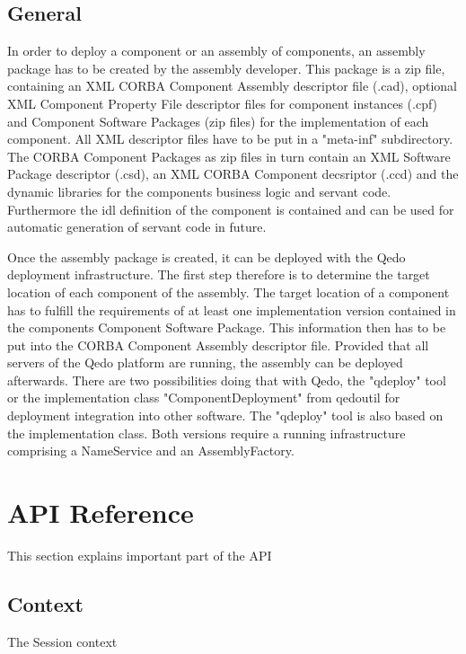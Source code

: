 \documentclass[12pt,a4paper]{report}
\begin{document}
\section{General}
\label{sec:General}

In order to deploy a component or an assembly of components, an assembly package has to be created by the assembly developer. This package is a zip file, containing an XML CORBA Component Assembly descriptor file (.cad), optional XML Component Property File descriptor files for component instances (.cpf) and Component Software Packages (zip files) for the implementation of each component. All XML descriptor files have to be put in a "meta-inf" subdirectory.
The CORBA Component Packages as zip files in turn contain an XML Software Package descriptor (.csd), an XML CORBA Component decsriptor (.ccd) and the dynamic libraries for the components business logic and servant code. Furthermore the idl definition of the component is contained and can be used for automatic generation of servant code in future.

Once the assembly package is created, it can be deployed with the Qedo deployment infrastructure. The first step therefore is to determine the target location of each component of the assembly. The target location of a component has to fulfill the requirements of at least one implementation version contained in the components Component Software Package. This information then has to be put into the CORBA Component Assembly descriptor file. Provided that all servers of the Qedo platform are running, the assembly can be deployed afterwards. There are two possibilities doing that with Qedo, the "qdeploy" tool or the implementation class "ComponentDeployment" from qedoutil for deployment integration into other software. The "qdeploy" tool is also based on the implementation class. Both versions require a running infrastructure comprising a NameService and an AssemblyFactory.  

\chapter{API Reference}
\label{sec:APIReference}

This section explains important part of the API

\section{Context}
\label{sec:Context}

The Session context
\end{document}

